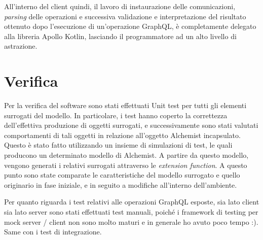 All'interno del client quindi, il lavoro di instaurazione delle comunicazioni, \textit{parsing} delle operazioni e successiva validazione e interpretazione del risultato ottenuto dopo l'esecuzione
di un'operazione GraphQL, è completamente delegato alla libreria Apollo Kotlin, lasciando il programmatore ad un alto livello di astrazione.


\clearpage
\section{Verifica}\label{sec:testing}
Per la verifica del software sono stati effettuati Unit test per tutti gli elementi surrogati del modello. In particolare, i test hanno coperto la correttezza dell'effettiva 
produzione di oggetti surrogati, e successivamente sono stati valutati comportamenti di tali oggetti in relazione all'oggetto Alchemist incapsulato. Questo è stato fatto
utilizzando un insieme di simulazioni di test, le quali producono un determinato modello di Alchemist. A partire da questo modello, vengono generati i relativi surrogati
attraverso le \textit{extension function}. A questo punto sono state comparate le caratteristiche del modello surrogato e quello originario in fase iniziale, e in seguito
a modifiche all'interno dell'ambiente.

Per quanto riguarda i test relativi alle operazioni GraphQL esposte, sia lato client sia lato server sono stati effettuati test manuali, poiché i framework di testing per
mock server / client non sono molto maturi e in generale ho avuto poco tempo :). Same con i test di integrazione.
